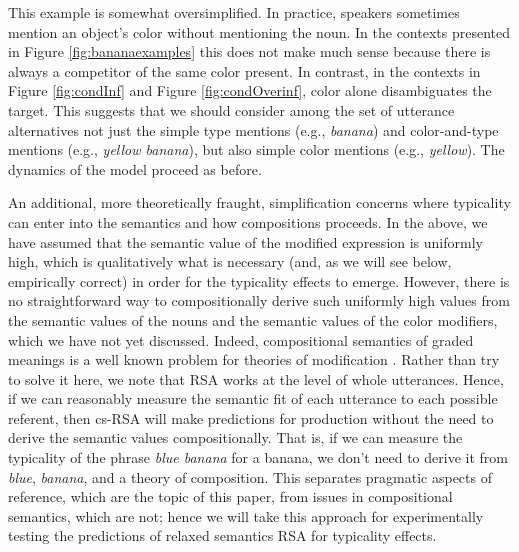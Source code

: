 \documentclass[11pt]{article}
\newcommand{\figref}[1]{Figure \ref{#1}}
\begin{document}
 

This example is somewhat oversimplified. In practice, speakers sometimes mention an object's color without mentioning the noun. In the contexts presented in \figref{fig:bananaexamples} this does not make much sense because there is always a competitor of the same color present. In contrast, in the contexts in \figref{fig:condInf} and \figref{fig:condOverinf}, color alone disambiguates the target. This suggests that we should consider among the set of utterance alternatives not just the simple type mentions (e.g., \emph{banana}) and color-and-type mentions (e.g., \emph{yellow banana}), but also simple color mentions (e.g., \emph{yellow}). The dynamics of the model proceed as before.

An additional, more theoretically fraught, simplification concerns where typicality can enter into the semantics and how compositions proceeds. In the above, we have assumed that the semantic value of the modified expression is uniformly high, which is qualitatively what is necessary (and, as we will see below, empirically correct) in order for the typicality effects to emerge. However, there is no straightforward way to compositionally derive such uniformly high values from the semantic values of the nouns and the semantic values of the color modifiers, which we have not yet discussed. Indeed, compositional semantics of graded meanings is a well known problem for theories of modification \cite{kamp1995,Osherson1981}. Rather than try to solve it here, we note that RSA works at the level of whole utterances. Hence, if we can reasonably measure the semantic fit of each utterance to each possible referent, then cs-RSA will make predictions for production without the need to derive the semantic values compositionally. That is, if we can measure the typicality of the phrase \emph{blue banana} for a banana, we don't need to derive it from \emph{blue}, \emph{banana}, and a theory of composition. This separates pragmatic aspects of reference, which are the topic of this paper, from issues in compositional semantics, which are not; hence we will take this approach for experimentally testing the predictions of relaxed semantics RSA for typicality effects.
\end{document}
